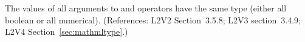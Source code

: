 The values of all arguments to  and  operators 
have the same type (either all boolean or all numerical).
(References: L2V2 Section~3.5.8; L2V3 section~3.4.9; L2V4
Section~\ref{sec:mathmltype}.)
